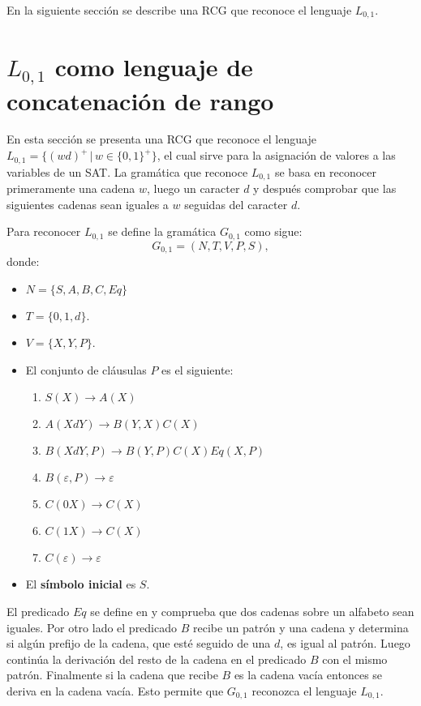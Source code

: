 \documentclass[12pt]{article}
\begin{document}
En la siguiente sección se describe una RCG que reconoce el lenguaje $L_{0,1}$.

\section{$L_{0,1}$ como lenguaje de concatenación de rango}

En esta sección se presenta una RCG que reconoce el lenguaje $L_{0,1}=\{(wd)^+\,|\,w\in\{0,1\}^+\}$,
el cual sirve para la asignación de valores a las variables de un SAT. La gramática que reconoce $L_{0,1}$
se basa en reconocer primeramente una cadena $w$, luego un caracter $d$ y después comprobar que las siguientes
cadenas sean iguales a $w$ seguidas del caracter $d$.

Para reconocer $L_{0,1}$ se define la gramática $G_{0,1}$ como sigue:
\[
    G_{0,1} = (N, T, V, P, S),
\]
donde:

\begin{itemize}
    \item $N=\{S,A,B,C,Eq\}$
    \item $T=\{0,1,d\}$.
    \item $V=\{X,Y,P\}$.
    \item El conjunto de cláusulas $P$ es el siguiente:
          \begin{enumerate}
              \item $S(X)\to A(X)$
              \item $A(XdY)\to B(Y,X)C(X)$
              \item $B(XdY,P)\to B(Y,P) C(X) Eq(X,P)$
              \item $B(\varepsilon,P)\to \varepsilon$
              \item $C(0X)\to C(X)$
              \item $C(1X)\to C(X)$
              \item $C(\varepsilon)\to \varepsilon$
          \end{enumerate}
    \item El \textbf{símbolo inicial} es $S$.
\end{itemize}

El predicado $Eq$ se define en \cite{mainRCGBib} y comprueba que dos cadenas sobre un alfabeto sean iguales.
Por otro lado el predicado $B$ recibe un patrón y una cadena y determina si algún prefijo de la cadena,
que esté seguido de una $d$, es igual al patrón. Luego continúa la derivación del resto de la cadena en el
predicado $B$ con el mismo patrón. Finalmente si la cadena que recibe $B$ es la cadena vacía entonces se
deriva en la cadena vacía. Esto permite que $G_{0,1}$ reconozca el lenguaje $L_{0,1}$.
\end{document}
